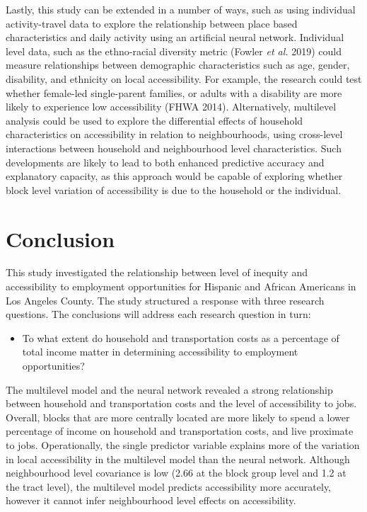 \documentclass[a4paper,UKenglish]{lipics-v2018}
\begin{document}
Lastly, this study can be extended in a number of ways, such as using individual activity-travel data to explore the relationship between place based characteristics and daily activity using an artificial neural network. Individual level data, such as the ethno‐racial diversity metric (Fowler \textit{et al.} 2019) could measure relationships between demographic characteristics such as age, gender, disability, and ethnicity on local accessibility. For example, the research could test whether female-led single-parent families, or adults with a disability are more likely to experience low accessibility (FHWA 2014). Alternatively, multilevel analysis could be used to explore the differential effects of household characteristics on accessibility in relation to neighbourhoods, using cross-level interactions between household and neighbourhood level characteristics. Such developments are likely to lead to both enhanced predictive accuracy and explanatory capacity, as this approach would be capable of exploring whether block level variation of accessibility is due to the household or the individual. 

\section{Conclusion}
This study investigated the relationship between level of inequity and accessibility to employment opportunities for Hispanic and African Americans in Los Angeles County. The study structured a response with three research questions. The conclusions will address each research question in turn:

\begin{itemize}
        \item To what extent do household and transportation costs as a percentage of total income matter in determining accessibility to employment opportunities?
\end{itemize} 
The multilevel model and the neural network revealed a strong relationship between household and transportation costs and the level of accessibility to jobs. Overall, blocks that are more centrally located are more likely to spend a lower percentage of income on household and transportation costs, and live proximate to jobs. Operationally, the single predictor variable explains more of the variation in local accessibility in the multilevel model than the neural network. Although neighbourhood level covariance is low (2.66 at the block group level and 1.2 at the tract level), the multilevel model predicts accessibility more accurately, however it cannot infer neighbourhood level effects on accessibility.
\end{document}

